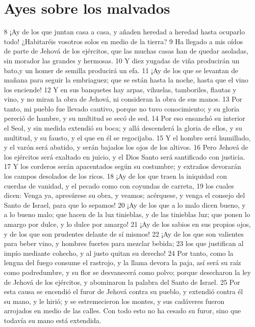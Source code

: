 \section*{Ayes sobre los malvados}

8 ¡Ay de los que juntan casa a casa, y añaden heredad a heredad hasta ocuparlo todo! ¿Habitaréis vosotros solos en medio de la tierra?
9 Ha llegado a mis oídos de parte de Jehová de los ejércitos, que las muchas casas han de quedar asoladas, sin morador las grandes y hermosas.
10 Y diez yugadas de viña producirán un bato,y un homer de semilla producirá un efa.
11 ¡Ay de los que se levantan de mañana para seguir la embriaguez; que se están hasta la noche, hasta que el vino los enciende!
12 Y en sus banquetes hay arpas, vihuelas, tamboriles, flautas y vino, y no miran la obra de Jehová, ni consideran la obra de sus manos.
13 Por tanto, mi pueblo fue llevado cautivo, porque no tuvo conocimiento; y su gloria pereció de hambre, y su multitud se secó de sed.
14 Por eso ensanchó su interior el Seol, y sin medida extendió su boca; y allá descenderá la gloria de ellos, y su multitud, y su fausto, y el que en él se regocijaba.
15 Y el hombre será humillado, y el varón será abatido, y serán bajados los ojos de los altivos.
16 Pero Jehová de los ejércitos será exaltado en juicio, y el Dios Santo será santificado con justicia.
17 Y los corderos serán apacentados según su costumbre; y extraños devorarán los campos desolados de los ricos.
18 ¡Ay de los que traen la iniquidad con cuerdas de vanidad, y el pecado como con coyundas de carreta,
19 los cuales dicen: Venga ya, apresúrese su obra, y veamos; acérquese, y venga el consejo del Santo de Israel, para que lo sepamos!
20 ¡Ay de los que a lo malo dicen bueno, y a lo bueno malo; que hacen de la luz tinieblas, y de las tinieblas luz; que ponen lo amargo por dulce, y lo dulce por amargo!
21 ¡Ay de los sabios en sus propios ojos, y de los que son prudentes delante de sí mismos!
22 ¡Ay de los que son valientes para beber vino, y hombres fuertes para mezclar bebida;
23 los que justifican al impío mediante cohecho, y al justo quitan su derecho!
24 Por tanto, como la lengua del fuego consume el rastrojo, y la llama devora la paja, así será su raíz como podredumbre, y su flor se desvanecerá como polvo; porque desecharon la ley de Jehová de los ejércitos, y abominaron la palabra del Santo de Israel.
25 Por esta causa se encendió el furor de Jehová contra su pueblo, y extendió contra él su mano, y le hirió; y se estremecieron los montes, y sus cadáveres fueron arrojados en medio de las calles. Con todo esto no ha cesado su furor, sino que todavía su mano está extendida.
